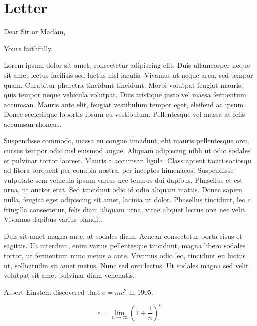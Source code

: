 

\section{Letter}\label{sec:letter}
\opening{Dear Sir or Madam,}
\closing{Yours faithfully,}
\makelettertitle

Lorem ipsum dolor sit amet, consectetur adipiscing elit.
Duis ullamcorper neque sit amet lectus facilisis sed luctus nisl iaculis.
Vivamus at neque arcu, sed tempor quam.
Curabitur pharetra tincidunt tincidunt.
Morbi volutpat feugiat mauris, quis tempor neque vehicula volutpat.
Duis tristique justo vel massa fermentum accumsan.
Mauris ante elit, feugiat vestibulum tempor eget, eleifend ac ipsum.
Donec scelerisque lobortis ipsum eu vestibulum.
Pellentesque vel massa at felis accumsan rhoncus.

Suspendisse commodo, massa eu congue tincidunt, elit mauris pellentesque orci, cursus tempor odio nisl euismod augue.
Aliquam adipiscing nibh ut odio sodales et pulvinar tortor laoreet.
Mauris a accumsan ligula.
Class aptent taciti sociosqu ad litora torquent per conubia nostra, per inceptos himenaeos.
Suspendisse vulputate sem vehicula ipsum varius nec tempus dui dapibus.
Phasellus et est urna, ut auctor erat.
Sed tincidunt odio id odio aliquam mattis.
Donec sapien nulla, feugiat eget adipiscing sit amet, lacinia ut dolor.
Phasellus tincidunt, leo a fringilla consectetur, felis diam aliquam urna, vitae aliquet lectus orci nec velit.
Vivamus dapibus varius blandit.

Duis sit amet magna ante, at sodales diam.
Aenean consectetur porta risus et sagittis.
Ut interdum, enim varius pellentesque tincidunt, magna libero sodales tortor, ut fermentum nunc metus a ante.
Vivamus odio leo, tincidunt eu luctus ut, sollicitudin sit amet metus.
Nunc sed orci lectus.
Ut sodales magna sed velit volutpat sit amet pulvinar diam venenatis.

Albert Einstein discovered that $e=mc^2$ in 1905.

\[ e=\lim_{n \to \infty} \left(1+\frac{1}{n}\right)^n \]

\makeletterclosing
